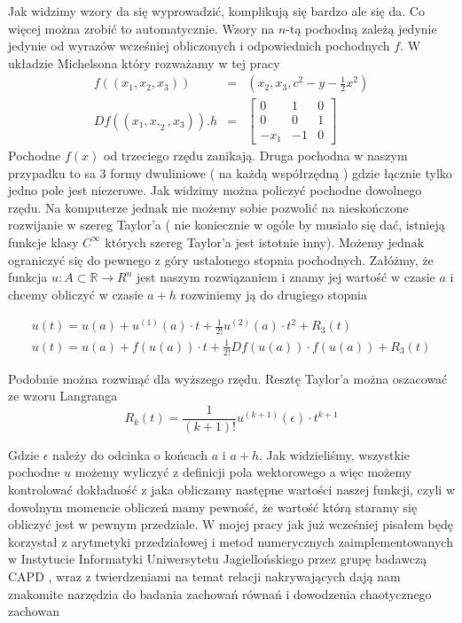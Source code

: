 Jak widzimy wzory da się wyprowadzić, komplikują się bardzo ale się da. Co więcej można zrobić to automatycznie. Wzory na $n$-tą pochodną zależą jedynie jedynie od 
wyrazów wcześniej obliczonych i odpowiednich pochodnych $ f $. W układzie Michelsona który rozważamy w tej pracy 
\begin{eqnarray*}
  f((x_1,x_2,x_3)) & = & (x_2,x_3, c^2 - y - \frac{1}{2}x^2) \\
  Df((x_1,x,_2,x_3)).h&  = &
  \begin{bmatrix}
    0 & 1 & 0 \\	
    0 & 0 & 1 \\
   -x_1 & -1 & 0 
  \end{bmatrix}
\end{eqnarray*}
Pochodne $ f(x) $ od trzeciego rzędu zanikają. Druga pochodna w naszym przypadku to sa 3 formy dwuliniowe ( na każdą współrzędną ) gdzie
łącznie tylko jedno pole jest niezerowe.
Jak widzimy można policzyć pochodne dowolnego rzędu. Na komputerze jednak nie możemy sobie pozwolić na nieskończone rozwijanie
w szereg Taylor'a ( nie koniecznie w ogóle by musiało się dać, istnieją funkcje klasy $ C^{\infty} $ których szereg Taylor'a jest istotnie inny).
Możemy jednak ograniczyć się do pewnego z góry ustalonego stopnia pochodnych. Załóżmy, że funkcja $ u : A \subset \mathbb R \to R^n $ jest 
naszym rozwiązaniem i znamy jej wartość w czasie $ a $ i chcemy obliczyć w czasie $ a + h $ rozwiniemy ją do drugiego stopnia

\begin{eqnarray*}
 u(t) = u(a) + u^{(1)}(a) \cdot t + \frac{1}{2!}u^{(2)}(a) \cdot t^2 + R_3(t) \\
 u(t) = u(a) + f(u(a)) \cdot t + \frac{1}{2!} Df(u(a)) \cdot f(u(a)) + R_3(t) 
\end{eqnarray*}

Podobnie można rozwinąć dla wyższego rzędu. 
Resztę Taylor'a można oszacować ze wzoru Langranga
$$
  R_k(t) = \frac{1}{(k+1)!}u^{(k+1)}(\epsilon) \cdot t^{k+1}
$$

Gdzie $ \epsilon $ należy do odcinka o końcach $ a $ i $ a+h$.
Jak widzieliśmy, wszystkie pochodne $ u $ możemy wyliczyć z definicji pola wektorowego a więc możemy kontrolować
dokładność z jaka obliczamy następne wartości naszej funkcji, czyli w dowolnym momencie obliczeń mamy pewność, że wartość
którą staramy się obliczyć jest w pewnym przedziale.
W mojej pracy jak już wcześniej pisałem będę korzystał z arytmetyki przedziałowej i metod numerycznych zaimplementowanych w Instytucie Informatyki Uniwersytetu 
 Jagiellońskiego przez grupę badawczą CAPD \cite{CAPD}, wraz z twierdzeniami na temat relacji nakrywających dają nam znakomite narzędzia do 
 badania zachowań równań i dowodzenia chaotycznego zachowan

 


